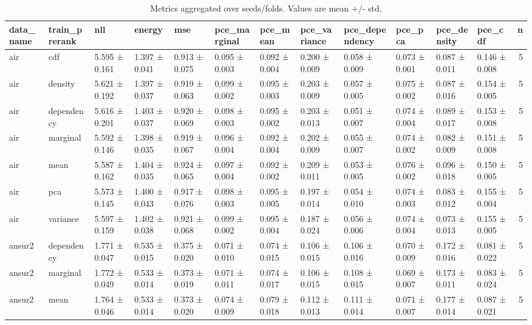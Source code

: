 \begin{table}
\caption{Metrics aggregated over seeds/folds. Values are mean +/- std.}
\label{tab:metrics_summary_all}
\begin{tabular}{llllllllllllr}
\toprule
data_name & train_prerank & nll & energy & mse & pce_marginal & pce_mean & pce_variance & pce_dependency & pce_pca & pce_density & pce_cdf & n \\
\midrule
air & cdf & 5.595 ± 0.161 & 1.397 ± 0.041 & 0.913 ± 0.075 & 0.095 ± 0.003 & 0.092 ± 0.004 & 0.200 ± 0.009 & 0.058 ± 0.009 & 0.073 ± 0.001 & 0.087 ± 0.011 & 0.146 ± 0.008 & 5 \\
air & density & 5.621 ± 0.192 & 1.397 ± 0.037 & 0.919 ± 0.063 & 0.099 ± 0.002 & 0.095 ± 0.003 & 0.203 ± 0.009 & 0.057 ± 0.005 & 0.075 ± 0.002 & 0.087 ± 0.016 & 0.154 ± 0.005 & 5 \\
air & dependency & 5.616 ± 0.201 & 1.403 ± 0.037 & 0.920 ± 0.069 & 0.098 ± 0.003 & 0.095 ± 0.002 & 0.203 ± 0.013 & 0.051 ± 0.007 & 0.074 ± 0.004 & 0.089 ± 0.017 & 0.153 ± 0.008 & 5 \\
air & marginal & 5.592 ± 0.146 & 1.398 ± 0.035 & 0.919 ± 0.067 & 0.096 ± 0.004 & 0.092 ± 0.004 & 0.202 ± 0.009 & 0.055 ± 0.007 & 0.074 ± 0.002 & 0.082 ± 0.009 & 0.151 ± 0.008 & 5 \\
air & mean & 5.587 ± 0.162 & 1.404 ± 0.035 & 0.924 ± 0.065 & 0.097 ± 0.004 & 0.092 ± 0.002 & 0.209 ± 0.011 & 0.053 ± 0.005 & 0.076 ± 0.002 & 0.096 ± 0.018 & 0.150 ± 0.005 & 5 \\
air & pca & 5.573 ± 0.145 & 1.400 ± 0.043 & 0.917 ± 0.076 & 0.098 ± 0.003 & 0.095 ± 0.005 & 0.197 ± 0.014 & 0.054 ± 0.010 & 0.074 ± 0.003 & 0.083 ± 0.012 & 0.155 ± 0.004 & 5 \\
air & variance & 5.597 ± 0.159 & 1.402 ± 0.038 & 0.921 ± 0.068 & 0.099 ± 0.002 & 0.095 ± 0.004 & 0.187 ± 0.024 & 0.056 ± 0.006 & 0.074 ± 0.004 & 0.073 ± 0.013 & 0.155 ± 0.005 & 5 \\
ansur2 & dependency & 1.771 ± 0.047 & 0.535 ± 0.015 & 0.375 ± 0.020 & 0.071 ± 0.010 & 0.074 ± 0.015 & 0.106 ± 0.015 & 0.106 ± 0.016 & 0.070 ± 0.009 & 0.172 ± 0.016 & 0.081 ± 0.022 & 5 \\
ansur2 & marginal & 1.772 ± 0.049 & 0.533 ± 0.014 & 0.373 ± 0.019 & 0.071 ± 0.011 & 0.074 ± 0.017 & 0.106 ± 0.015 & 0.108 ± 0.015 & 0.069 ± 0.007 & 0.173 ± 0.011 & 0.083 ± 0.024 & 5 \\
ansur2 & mean & 1.764 ± 0.046 & 0.533 ± 0.014 & 0.373 ± 0.020 & 0.074 ± 0.009 & 0.079 ± 0.018 & 0.112 ± 0.013 & 0.111 ± 0.014 & 0.071 ± 0.007 & 0.177 ± 0.014 & 0.087 ± 0.021 & 5 \\

\end{tabular}
\end{table}
